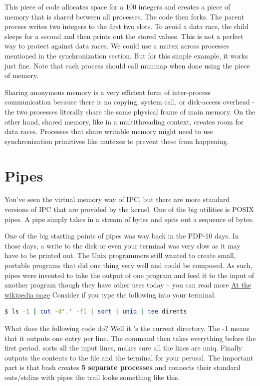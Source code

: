 This piece of code allocates space for a 100 integers and creates a piece of memory that is shared between all processes.
The code then forks.
The parent process writes two integers to the first two slots.
To avoid a data race, the child sleeps for a second and then prints out the stored values.
This is not a perfect way to protect against data races.
We could use a mutex across processes mentioned in the synchronization section.
But for this simple example, it works just fine.
Note that each process should call munmap when done using the piece of memory.

Sharing anonymous memory is a very efficient form of inter-process communication because there is no copying, system call, or disk-access overhead - the two processes literally share the same physical frame of main memory.
On the other hand, shared memory, like in a multithreading context, creates room for data races.
Processes that share writable memory might need to use synchronization primitives like mutexes to prevent these from happening.

\section{Pipes}

You've seen the virtual memory way of IPC, but there are more standard versions of IPC that are provided by the kernel.
One of the big utilities is POSIX pipes.
A pipe simply takes in a stream of bytes and spits out a sequence of bytes.

One of the big starting points of pipes was way back in the PDP-10 days. In those days, a write to the disk or even your terminal was very slow as it may have to be printed out.
The Unix programmers still wanted to create small, portable programs that did one thing very well and could be composed.
As such, pipes were invented to take the output of one program
and feed it to the input of another program though they have other uses today -- you can read more \href{https://en.wikipedia.org/wiki/Pipeline\_\%28Unix\%29}{At the wikipedia page}
Consider if you type the following into your terminal.

\begin{lstlisting}[language=bash]
$ ls -1 | cut -d'.' -f1 | sort | uniq | tee dirents
\end{lstlisting}

What does the following code do? Well it 's the current directory.
The -1 means that it outputs one entry per line.
The  command then takes everything before the first period.
 sorts all the input lines,  makes sure all the lines are uniq.
Finally  outputs the contents to the file  and the terminal for your perusal.
The important part is that bash creates \textbf{5 separate processes} and connects their standard outs/stdins with pipes the trail looks something like this.

